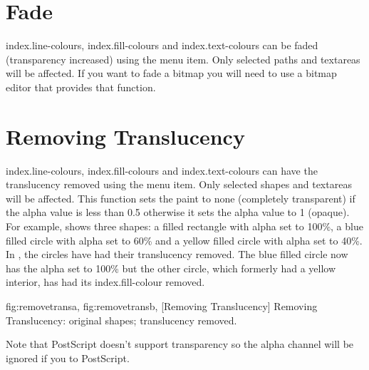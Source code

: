 
\section{Fade}\label{sec:fade}


\Glspl{index.line-colour}, \glspl{index.fill-colour} and
\glspl{index.text-colour} can be faded (transparency increased)
using the  menu item. Only selected
\glspl{path} and \glspl{textarea} will be affected. If you want to
fade a \gls{bitmap} you will need to use a bitmap editor that
provides that function.


\section{Removing Translucency}\label{sec:removetrans}


\Glspl{index.line-colour}, \glspl{index.fill-colour} and
\glspl{index.text-colour} can have the translucency removed using
the  menu item. Only selected
\glspl{shape} and \glspl{textarea} will be affected. This function
sets the paint to none (completely transparent) if the alpha value
is less than 0.5 otherwise it sets the alpha value to 1 (opaque).
For example,  shows three shapes: a
filled rectangle with alpha set to 100\%, a blue filled circle with
alpha set to 60\% and a yellow filled circle with alpha set to 40\%.
In , the circles have had their
translucency removed. The blue filled circle now has the alpha set
to 100\% but the other circle, which formerly had a yellow interior,
has had its \gls{index.fill-colour} removed.

{
 {fig:removetransa}{}{},
 {fig:removetransb}{}{},
}
[Removing Translucency]
{Removing Translucency:  original shapes;
   translucency removed.}

\begin{warning}
Note that PostScript doesn't support transparency so the
alpha channel will be ignored if you  to PostScript.
\end{warning}

